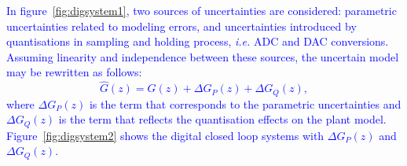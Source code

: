 \documentclass{sig-alternate-05-2015}
\begin{document}
%
\textcolor{blue}{
In figure~\ref{fig:digsystem1}, two sources of uncertainties are considered: parametric uncertainties related to modeling errors, and uncertainties introduced by quantisations in sampling and holding process, {\it i.e.} ADC and DAC conversions. Assuming linearity and independence between these sources, the uncertain model may be rewritten as follows:
\begin{equation}
\hat{G}(z)=G(z)+\Delta G_{P}(z)+\Delta G_{Q}(z),
\end{equation}
where $\Delta G_{P}(z)$ is the term that corresponds to the parametric uncertainties and $\Delta G_{Q}(z)$ is the term that reflects the quantisation effects on the plant model. Figure~\ref{fig:digsystem2} shows the digital closed loop systems with $\Delta G_{P}(z)$ and $\Delta G_{Q}(z)$.}
\end{document}
